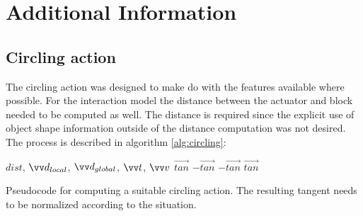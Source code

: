 \chapter{Additional Information}

\section{Circling action \label{sec:circling}}

The circling action was designed to make do with the features available where possible.
For the interaction model the distance between the actuator and block needed to be computed as well. The distance is required since the explicit use of object shape information outside of the distance computation was not desired. 
The process is described in algorithm \ref{alg:circling}:

\begin{algorithm}
\begin{algorithmic}[1]
\Statex
{} {$dist$, $\protect\vec{d}_{local}$, $\protect\vec{d}_{global}$, $\protect\vec{t}$, $\protect\vec{v}$}
	\Else 
	\EndIf
	\State {}
\EndFunction
\Statex
{}
			\State \Return $\vec{tan}$
		\Else
			\State \Return $-\vec{tan}$
		\EndIf
	\Else
			\State \Return $-\vec{tan}$
		\Else
			\State \Return $\vec{tan}$
		\EndIf
	\EndIf
\EndFunction
\end{algorithmic}
\caption{Pseudocode for computing a suitable circling action. The resulting tangent needs to be normalized according to the situation.}
\label{alg:circling}
\end{algorithm}


